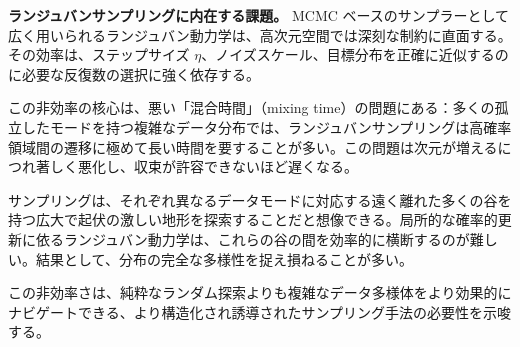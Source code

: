 \textbf{ランジュバンサンプリングに内在する課題。} MCMC ベースのサンプラーとして広く用いられるランジュバン動力学は、高次元空間では深刻な制約に直面する。その効率は、ステップサイズ $\eta$、ノイズスケール、目標分布を正確に近似するのに必要な反復数の選択に強く依存する。

この非効率の核心は、悪い「混合時間」（mixing time）の問題にある：多くの孤立したモードを持つ複雑なデータ分布では、ランジュバンサンプリングは高確率領域間の遷移に極めて長い時間を要することが多い。この問題は次元が増えるにつれ著しく悪化し、収束が許容できないほど遅くなる。

サンプリングは、それぞれ異なるデータモードに対応する遠く離れた多くの谷を持つ広大で起伏の激しい地形を探索することだと想像できる。局所的な確率的更新に依るランジュバン動力学は、これらの谷の間を効率的に横断するのが難しい。結果として、分布の完全な多様性を捉え損ねることが多い。

この非効率さは、純粋なランダム探索よりも複雑なデータ多様体をより効果的にナビゲートできる、より構造化され誘導されたサンプリング手法の必要性を示唆する。



